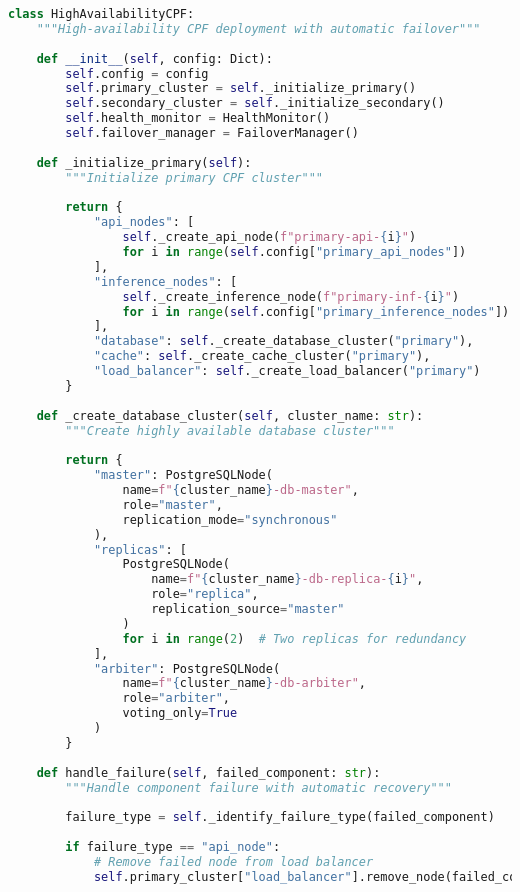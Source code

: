 \documentclass[11pt,a4paper]{article}
\begin{document}
\begin{lstlisting}[language=Python, caption=High-Availability CPF Configuration]
class HighAvailabilityCPF:
    """High-availability CPF deployment with automatic failover"""
    
    def __init__(self, config: Dict):
        self.config = config
        self.primary_cluster = self._initialize_primary()
        self.secondary_cluster = self._initialize_secondary()
        self.health_monitor = HealthMonitor()
        self.failover_manager = FailoverManager()
        
    def _initialize_primary(self):
        """Initialize primary CPF cluster"""
        
        return {
            "api_nodes": [
                self._create_api_node(f"primary-api-{i}")
                for i in range(self.config["primary_api_nodes"])
            ],
            "inference_nodes": [
                self._create_inference_node(f"primary-inf-{i}")
                for i in range(self.config["primary_inference_nodes"])
            ],
            "database": self._create_database_cluster("primary"),
            "cache": self._create_cache_cluster("primary"),
            "load_balancer": self._create_load_balancer("primary")
        }
    
    def _create_database_cluster(self, cluster_name: str):
        """Create highly available database cluster"""
        
        return {
            "master": PostgreSQLNode(
                name=f"{cluster_name}-db-master",
                role="master",
                replication_mode="synchronous"
            ),
            "replicas": [
                PostgreSQLNode(
                    name=f"{cluster_name}-db-replica-{i}",
                    role="replica",
                    replication_source="master"
                )
                for i in range(2)  # Two replicas for redundancy
            ],
            "arbiter": PostgreSQLNode(
                name=f"{cluster_name}-db-arbiter",
                role="arbiter",
                voting_only=True
            )
        }
    
    def handle_failure(self, failed_component: str):
        """Handle component failure with automatic recovery"""
        
        failure_type = self._identify_failure_type(failed_component)
        
        if failure_type == "api_node":
            # Remove failed node from load balancer
            self.primary_cluster["load_balancer"].remove_node(failed_component)
            

\end{lstlisting}
\end{document}
